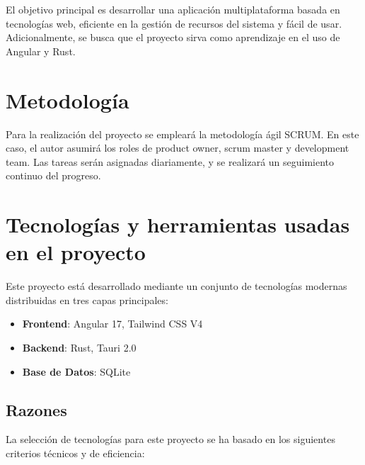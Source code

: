 \documentclass[11pt, a4paper]{article}
\begin{document}
El objetivo principal es desarrollar una aplicación multiplataforma basada en tecnologías web, eficiente en la gestión de recursos del sistema y fácil de usar. Adicionalmente, se busca que el proyecto sirva como aprendizaje en el uso de Angular y Rust.

\section{Metodología}

Para la realización del proyecto se empleará la metodología ágil SCRUM. En este caso, el autor asumirá los roles de product owner, scrum master y development team. Las tareas serán asignadas diariamente, y se realizará un seguimiento continuo del progreso.

\section{Tecnologías y herramientas usadas en el proyecto}

Este proyecto está desarrollado mediante un conjunto de tecnologías modernas
distribuidas en tres capas principales:

    \begin{itemize}
        \item \textbf{Frontend}: Angular 17, Tailwind CSS V4
        \item \textbf{Backend}: Rust, Tauri 2.0
        \item \textbf{Base de Datos}: SQLite
    \end{itemize}

    \subsection{Razones}

    La selección de tecnologías para este proyecto se ha basado en los siguientes criterios técnicos y de eficiencia: 
\end{document}
